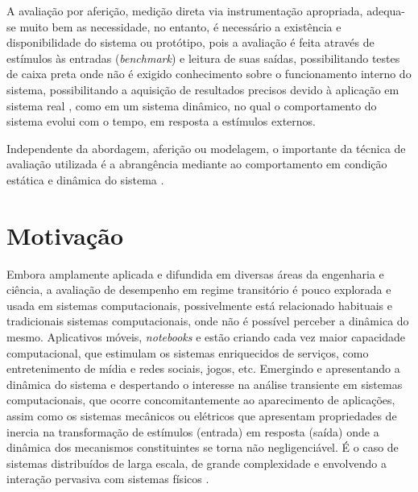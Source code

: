 A avaliação por aferição, medição direta via instrumentação apropriada, adequa-se muito bem as necessidade, no entanto, é necessário a existência e disponibilidade do sistema ou protótipo, pois a avaliação é feita através de estímulos às entradas (\textit{benchmark}) e leitura de suas saídas, possibilitando testes de caixa preta onde não é exigido conhecimento sobre o funcionamento interno do sistema, possibilitando a aquisição de resultados precisos devido à aplicação em sistema real \cite{Nobile2013}, como em um sistema dinâmico, no qual o comportamento do sistema evolui com o tempo, em resposta a estímulos externos.

Independente da abordagem, aferição ou modelagem, o importante da técnica de avaliação utilizada é a abrangência mediante ao comportamento em condição estática e dinâmica do sistema \cite{helder2014}.


\section{Motivação}

Embora amplamente aplicada e difundida em diversas áreas da engenharia e ciência, a avaliação de desempenho em regime transitório é pouco explorada e usada em sistemas computacionais, possivelmente está relacionado habituais e tradicionais sistemas computacionais, onde não é possível perceber a dinâmica do mesmo. Aplicativos móveis, \textit{notebooks} e \textit{} estão criando cada vez maior capacidade computacional, que estimulam os sistemas enriquecidos de serviços, como entretenimento de mídia e redes sociais, jogos, etc. Emergindo e apresentando a dinâmica do sistema e despertando o interesse na análise transiente em sistemas computacionais, que ocorre concomitantemente ao aparecimento de aplicações, assim como os sistemas mecânicos ou elétricos que apresentam propriedades de inercia na transformação de estímulos (entrada) em resposta (saída) onde a dinâmica dos mecanismos constituintes se torna não negligenciável. É o caso de sistemas distribuídos de larga escala, de grande complexidade e envolvendo a interação pervasiva com sistemas físicos \cite{Egami2011, Kannan2011}. 

